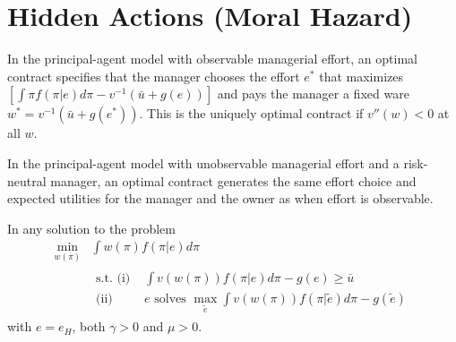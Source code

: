 \addtocounter{section}{1}

\section{Hidden Actions (Moral Hazard)}

\begin{prop}
    In the principal-agent model with observable managerial effort, an optimal contract specifies that the manager chooses the effort $e^*$ that maximizes $\left[ \int \pi f(\pi | e) d \pi - v^{-1}(\bar{u} + g(e))\right]$ and pays the manager a fixed ware $w^* = v^{-1}(\bar{u} + g(e^*))$. This is the uniquely optimal contract if $v''(w) < 0$ at all $w$.
\end{prop}

\begin{prop}
    In the principal-agent model with unobservable managerial effort and a risk-neutral manager, an optimal contract generates the same effort choice and expected utilities for the manager and the owner as when effort is observable.
\end{prop}

\begin{lem}
    In any solution to the problem
    \begin{equation*}
        \begin{aligned}
            \min_{w(\pi)} &\int w(\pi) f(\pi | e) d \pi \\
            &\begin{aligned}
                \text{s.t. (i) } &\int v\left(w(\pi)\right) f(\pi |e) d \pi - g(e) \geq \bar{u} \\
                \text{(ii) } &e \text{ solves } \max_{\tilde{e}} \int v\left(w(\pi)\right) f(\pi | \tilde{e}) d \pi - g(\tilde{e})
            \end{aligned}
        \end{aligned}
    \end{equation*}
    with $e = e_H$, both $\gamma > 0$ and $\mu > 0$.
\end{lem}

